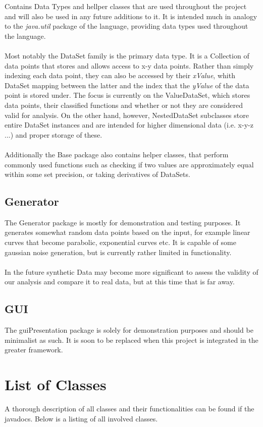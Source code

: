 \documentclass[main.tex]{subfiles}
\begin{document}
      Contains Data Types and hellper classes that are used throughout the project and will also be used in any future additions to it. It is intended much in analogy to the \emph{java.util} package of the language, providing data types used throughout the language. 
      \\\\
      Most notably the DataSet family is the primary data type. It is a Collection of data points that stores and allows access to x-y data points. Rather than simply indexing each data point, they can also be accessed by their \emph{xValue}, whith DataSet mapping between the latter and the index that the \emph{yValue} of the data point is stored under. The focus is currently on the ValueDataSet, which stores data points, their classified functions and whether or not they are considered valid for analysis. On the other hand, however, NestedDataSet subclasses store entire DataSet instances and are intended for higher dimensional data (i.e. x-y-z ...) and proper storage of these.
      \\\\
      Additionally the Base package also contains helper classes, that perform commonly used functions such as checking if two values are approximately equal within some set precision, or taking derivatives of DataSets.
      
    \subsection{Generator}
    
      The Generator package is mostly for demonstration and testing purposes. It generates somewhat random data points based on the input, for example linear curves that become parabolic, exponential curves etc. It is capable of some gaussian noise generation, but is currently rather limited in functionality.
      \\\\
      In the future synthetic Data may become more significant to assess the validity of our analysis and compare it to real data, but at this time that is far away.
      
    \subsection{GUI}
      
      The guiPresentation package is solely for demonstration purposes and should be minimalist as such. It is soon to be replaced when this project is integrated in the greater framework.
  
  \section{List of Classes}
    
    A thorough description of all classes and their functionalities can be found if the javadocs. Below is a listing of all involved classes.
    
\end{document}
